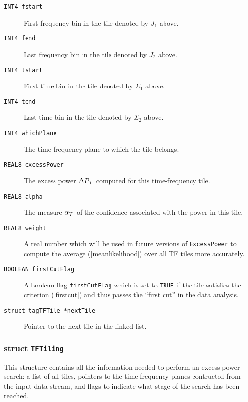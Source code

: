 \begin{description}
\item[\texttt{INT4 fstart}] First frequency bin in the tile denoted by
$J_1$ above.

\item[\texttt{INT4 fend}] Last frequency bin in the tile denoted by $J_2$
above.

\item[\texttt{INT4 tstart}] First time bin in the tile denoted by $\Sigma_1$
above.

\item[\texttt{INT4 tend}] Last time bin in the tile denoted by $\Sigma_2$
above.

\item[\texttt{INT4 whichPlane}] The time-frequency plane to which the tile
     belongs.

\item[\texttt{REAL8 excessPower}] The excess power $\Delta P_{\cal T}$ computed 
for this time-frequency tile.

\item[\texttt{REAL8 alpha}] The measure $\alpha_{\cal T}$ of the confidence
associated with the power in this tile.

\item[\texttt{REAL8 weight}] A real number which will be used in future
versions of \verb+ExcessPower+ to compute the average (\ref{meanlikelihood}) 
over all TF tiles more accurately.

\item[\texttt{BOOLEAN firstCutFlag}] A boolean flag \verb+firstCutFlag+ which 
is set to \verb+TRUE+ if the tile satisfies the criterion (\ref{firstcut}) 
and thus passes the ``first cut'' in the data analysis.  

\item[\texttt{struct tagTFTile *nextTile}] Pointer to the next tile in the
     linked list.
\end{description}

\subsubsection*{struct \texttt{TFTiling}}

\noindent This structure contains all the information needed to perform an
excess power search:  a list of all tiles,  pointers to the time-frequency
planes contructed from the input data stream,  and flags to indicate what
stage of the search has been reached.


